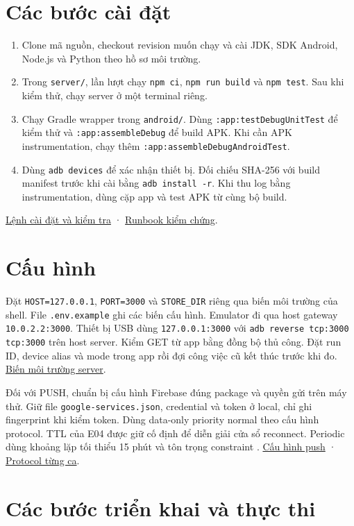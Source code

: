 \documentclass[12pt,a4paper]{report}
\newcommand{\repo}{https://github.com/ThanhTris/Seminar-IE307/blob/db8dc5f}
\newcommand{\source}[2]{\href{\repo/#1}{#2}}
\begin{document}
\section{Các bước cài đặt}
\begin{enumerate}
  \item Clone mã nguồn, checkout revision muốn chạy và cài JDK, SDK Android, Node.js và Python theo hồ sơ môi trường.
  \item Trong \texttt{server/}, lần lượt chạy \texttt{npm ci}, \texttt{npm run build} và \texttt{npm test}. Sau khi kiểm thử, chạy server ở một terminal riêng.
  \item Chạy Gradle wrapper trong \texttt{android/}. Dùng \texttt{:app:testDebugUnitTest} để kiểm thử và \texttt{:app:assembleDebug} để build APK. Khi cần APK instrumentation, chạy thêm \texttt{:app:assembleDebugAndroidTest}.
  \item Dùng \texttt{adb devices} để xác nhận thiết bị. Đối chiếu SHA-256 với build manifest trước khi cài bằng \texttt{adb install -r}. Khi thu log bằng instrumentation, dùng cặp app và test APK từ cùng bộ build.
\end{enumerate}
\source{docs/SETUP.md}{Lệnh cài đặt và kiểm tra} · \source{docs/DEMO_RUNBOOK.md}{Runbook kiểm chứng}.

\section{Cấu hình}
Đặt \texttt{HOST=127.0.0.1}, \texttt{PORT=3000} và \texttt{STORE\_DIR} riêng qua biến môi trường của shell. File \texttt{.env.example} ghi các biến cấu hình. Emulator đi qua host gateway \texttt{10.0.2.2:3000}. Thiết bị USB dùng \texttt{127.0.0.1:3000} với \texttt{adb reverse tcp:3000 tcp:3000} trên host server. Kiểm GET từ app bằng đồng bộ thủ công. Đặt run ID, device alias và mode trong app rồi đợi công việc cũ kết thúc trước khi đo. \source{docs/setup/SERVER.md}{Biến môi trường server}.

Đối với PUSH, chuẩn bị cấu hình Firebase đúng package và quyền gửi trên máy thử. Giữ file \texttt{google-services.json}, credential và token ở local, chỉ ghi fingerprint khi kiểm token. Dùng data-only priority normal theo cấu hình protocol. TTL của E04 được giữ cố định để diễn giải cửa sổ reconnect. Periodic dùng khoảng lặp tối thiểu 15 phút và tôn trọng constraint \citep{AndroidDefineWork,FirebaseAndroidPriority}. \source{docs/PUSH.md}{Cấu hình push} · \source{experiments/PROTOCOL.md}{Protocol từng ca}.

\section{Các bước triển khai và thực thi}
\end{document}
